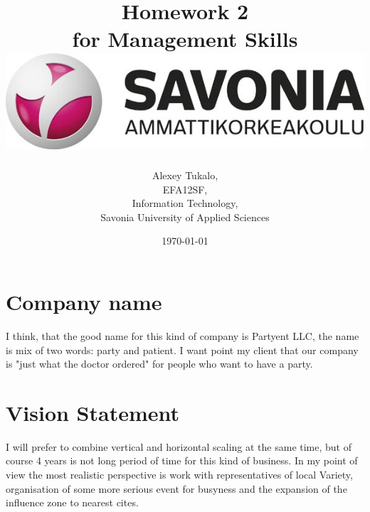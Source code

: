 \documentclass[english]{article}
\date{}
\begin{document}
\title{\vspace{2in}Homework 2\\
\small for Management Skills\\
\vspace{0.5in}\includegraphics{savonia.jpg}}

\nopagebreak
\maketitle


\vspace{3in}

\author{
\begin{flushright}
Alexey Tukalo,\\
EFA12SF,\\
Information Technology,\\
Savonia University of Applied Sciences
\end{flushright}
}

\date{\today}
\thispagestyle{empty}

\newpage
\setcounter{page}{1}
\setcounter{tocdepth}{2}


\newpage


\section{Company name}
 I think, that the good name for this kind of company is Partyent LLC, the name is mix of two words: party and patient. I want point my client that our company is "just what the doctor ordered" for people who want to have a party.
\section{Vision Statement}
 I will prefer to combine vertical and horizontal scaling at the same time, but of course 4 years is not long period of time for this kind of business. In my point of view the most realistic perspective is work with representatives of local Variety, organisation of some more serious event for busyness and the expansion of the influence zone to nearest cites.
\end{document}

